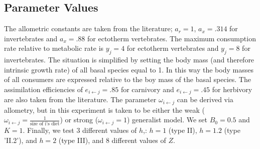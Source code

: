 \documentclass[11pt]{amsart}
\begin{document}
\subsection{Parameter Values}
The allometric constants are taken from the literature; $a_r =1 $, $a_x = .314$ for invertebrates and $a_x = .88$ for ectotherm vertebrates.  The maximum consumption rate relative to metabolic rate is $y_j = 4$ for ectotherm vertebrates and $y_j = 8$ for invertebrates.  The situation is simplified by setting the body mass (and therefore intrinsic growth rate) of all basal species equal to 1.  In this way the body masses of all consumers are expressed relative to the boy mass of the basal species.  The assimilation efficiencies of $e_{i\leftarrow j} = .85$ for carnivory and $e_{i\leftarrow j} = .45$ for herbivory are also taken from the literature.  The parameter $\omega_{i\leftarrow j}$ can be derived via allometry, but in this experiment is taken to be either the weak  ($\omega_{i\leftarrow j} = \frac{1}{\text{size of i's diet}}$) or strong ($\omega_{i\leftarrow j} =1$) generalist model.  We set $B_0 = 0.5$ and $K=1$.  Finally, we test $3$ different values of $h$,: $h=1$ (type II), $h=1.2$ (type 'II.2'), and $h=2$ (type III), and 8 different values of $Z$.
\end{document}
